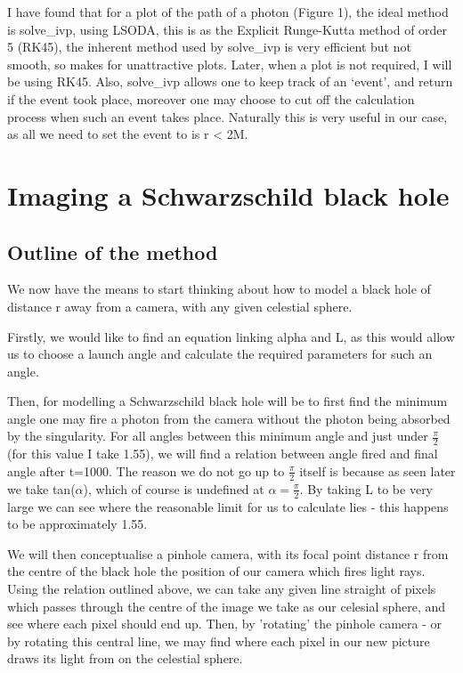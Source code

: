 \documentclass[oneside,openright,frontopenright]{dmathesis}
\begin{document}
	I have found that for a plot of the path of a photon (Figure 1), the ideal method is solve\_ivp\cite{2020SciPy-NMeth}, using LSODA\cite{hindmarsh2005lsoda}, this is as the Explicit Runge-Kutta method of order 5 (RK45)\cite{fehlberg1969low}, the inherent method used by solve\_ivp is very efficient but not smooth, so makes for unattractive plots. Later, when a plot is not required, I will be using RK45. Also, solve\_ivp allows one to keep track of an ‘event’, and return if the event took place, moreover one may choose to cut off the calculation process when such an event takes place. Naturally this is very useful in our case, as all we need to set the event to is r < 2M.


\chapter{Imaging a Schwarzschild black hole}
\section{Outline of the method}

	We now have the means to start thinking about how to model a black hole of distance r away from a camera, with any given celestial sphere.

	Firstly, we would like to find an equation linking alpha and L, as this would allow us to choose a launch angle and calculate the required parameters for such an angle.

	Then, for modelling a Schwarzschild black hole will be to first find the minimum angle one may fire a photon from the camera without the photon being absorbed by the singularity. For all angles between this minimum angle and just under $\frac{\pi}{2}$ (for this value I take 1.55), we will find a relation between angle fired and final angle after t=1000. The reason we do not go up to $\frac{\pi}{2}$ itself is because as seen later we take tan($\alpha$), which of course is undefined at $\alpha = \frac{\pi}{2}$. By taking L to be very large we can see where the reasonable limit for us to calculate lies - this happens to be approximately 1.55.

	We will then conceptualise a pinhole camera, with its focal point distance r from the centre of the black hole the position of our camera which fires light rays. Using the relation outlined above, we can take any given line straight of pixels which passes through the centre of the image we take as our celesial sphere, and see where each pixel should end up. Then, by 'rotating' the pinhole camera - or by rotating this central line, we may find where each pixel in our new picture draws its light from on the celestial sphere.
\end{document}
